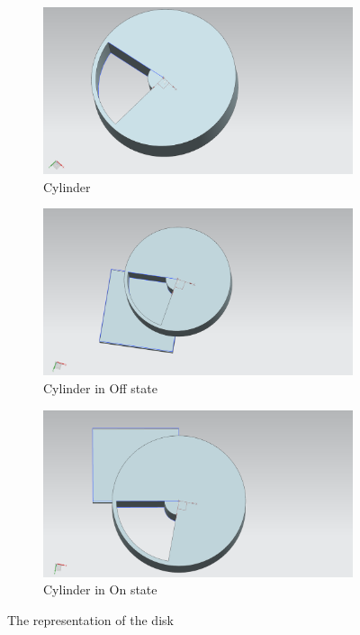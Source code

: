\begin{figure}[ht] 
     \centering
     \begin{subfigure}[b]{0.49\linewidth}
     \includegraphics[width=\linewidth]{content/060_mechanical_design/cylinder.png}
     \caption{Cylinder}
     \label{fig:Cylinder1}
     \end{subfigure}
     \begin{subfigure}[b]{0.49\linewidth}
     \includegraphics[width=\linewidth]{content/060_mechanical_design/cylinder2.png}
     \caption {Cylinder in Off state}
     \label{fig:Cylinder2}
     \end{subfigure}
     \label{fig:pwm}
     \begin{subfigure}[c]{0.49\linewidth}
     \includegraphics[width=\linewidth]{content/060_mechanical_design/cylinder3.png}
     \caption {Cylinder in On state}
     \label{fig:Cylinder3}
     \end{subfigure}
     \caption{The representation of the disk}
     \label{fig:cylinder}
\end{figure}

